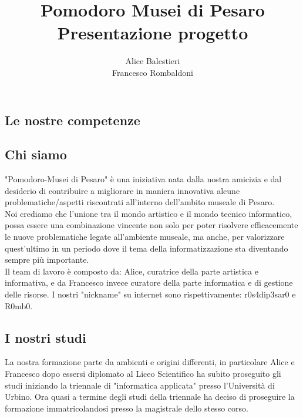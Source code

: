 \documentclass[hidelinks,12pt,a4paper]{article}
\begin{document}
	\begin{flushleft}
		
		\title{\textbf{Pomodoro Musei di Pesaro}\\\small{Presentazione progetto}}
		\author{Alice Balestieri\\ Francesco Rombaldoni}
		\date{}
		
		\maketitle
		
		\setcounter{page}{1}
		\newpage
		\tableofcontents
		\newpage
			
			\section{Le nostre competenze}
				\subsection{Chi siamo}
				"Pomodoro-Musei di Pesaro" è una iniziativa nata dalla nostra amicizia e dal desiderio di contribuire a migliorare in maniera innovativa alcune problematiche/aspetti riscontrati all'interno dell'ambito museale di Pesaro.\\
				Noi crediamo che l'unione tra il mondo artistico e il mondo tecnico informatico, possa essere una combinazione vincente non solo per poter risolvere efficacemente le nuove problematiche legate all'ambiente museale, ma anche, per valorizzare quest'ultimo in un periodo dove il tema della informatizzazione sta diventando sempre più importante.\\
				Il team di lavoro è composto da: Alice, curatrice della parte artistica e informativa, e da Francesco invece curatore della parte informatica e di gestione delle risorse. I nostri "nickname" su internet sono rispettivamente: r0s4dip3sar0 e R0mb0. 
				
				\subsection{I nostri studi}
				La nostra formazione parte da ambienti e origini differenti, in particolare Alice
				e Francesco dopo essersi diplomato al Liceo Scientifico ha subito proseguito gli studi iniziando la triennale di "informatica applicata" presso l'Università di Urbino. Ora quasi a termine degli studi della triennale ha deciso di proseguire la formazione immatricolandosi presso la magistrale dello stesso corso. 
				

\end{flushleft}
\end{document}

